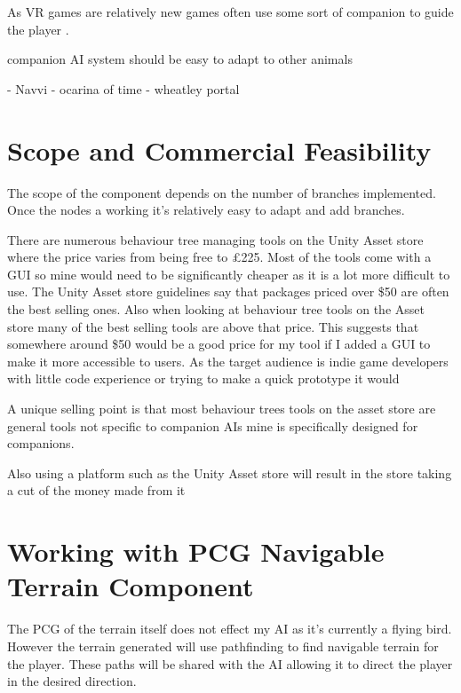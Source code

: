 \documentclass{scrartcl}
\begin{document}
As VR games are relatively new games often use some sort of companion to guide the player \cite{RobinsonVR} .


companion AI system 
should be easy to adapt to other animals

- Navvi - ocarina of time
- wheatley portal



\section{Scope and Commercial Feasibility}
The scope of the component depends on the number of branches implemented. Once the nodes a working it's relatively easy to adapt and add branches.

There are numerous behaviour tree managing tools on the Unity Asset store where the price varies from being free to \pounds225. Most of the tools come with a GUI so mine would need to be significantly cheaper as it is a lot more difficult to use.
The Unity Asset store guidelines say that packages priced over \$50 are often the best selling ones. Also when looking at behaviour tree tools on the Asset store many of the best selling tools are above that price. This suggests that somewhere around \$50 would be a good price for my tool if I added a GUI to make it more accessible to users. As the target audience is indie game developers with little code experience or trying to make a quick prototype it would 
\bigskip

A unique selling point is that most behaviour trees tools on the asset store are general tools not specific to companion AIs mine is specifically designed for companions. 


Also using a platform such as the Unity Asset store will result in the store taking a cut of the money made from it 


\section{ Working with PCG Navigable Terrain Component }
The PCG of the terrain itself does not effect my AI as it's currently a flying bird. However the terrain generated will use pathfinding to find navigable terrain for the player. These paths will be shared with the AI allowing it  to direct the player in the desired direction. 



	
\end{document}
